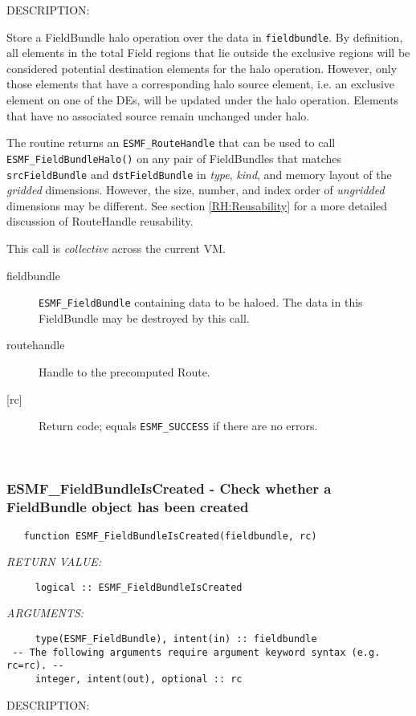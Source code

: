 {\sf DESCRIPTION:\\ }


   Store a FieldBundle halo operation over the data in {\tt fieldbundle}.
   By definition, all elements in the total Field regions that lie
   outside the exclusive regions will be considered potential destination
   elements for the halo operation. However, only those elements that have a corresponding
   halo source element, i.e. an exclusive element on one of the DEs, will be
   updated under the halo operation. Elements that have no associated source
   remain unchanged under halo.
  
   The routine returns an {\tt ESMF\_RouteHandle} that can be used to call
   {\tt ESMF\_FieldBundleHalo()} on any pair of FieldBundles that matches
   {\tt srcFieldBundle} and {\tt dstFieldBundle} in {\em type}, {\em kind},
   and memory layout of the {\em gridded} dimensions. However, the size,
   number, and index order of {\em ungridded} dimensions may be different.
   See section \ref{RH:Reusability} for a more detailed discussion of
   RouteHandle reusability.
  
   This call is {\em collective} across the current VM.
  
   \begin{description}
   \item [fieldbundle]
   {\tt ESMF\_FieldBundle} containing data to be haloed. The data in this
   FieldBundle may be destroyed by this call.
   \item [routehandle]
   Handle to the precomputed Route.
   \item [{[rc]}]
   Return code; equals {\tt ESMF\_SUCCESS} if there are no errors.
   \end{description}
   
 
\mbox{}\hrulefill\ 
 
\subsubsection [ESMF\_FieldBundleIsCreated] {ESMF\_FieldBundleIsCreated - Check whether a FieldBundle object has been created}


\begin{verbatim}   function ESMF_FieldBundleIsCreated(fieldbundle, rc)\end{verbatim}{\em RETURN VALUE:}
\begin{verbatim}     logical :: ESMF_FieldBundleIsCreated\end{verbatim}{\em ARGUMENTS:}
\begin{verbatim}     type(ESMF_FieldBundle), intent(in) :: fieldbundle
 -- The following arguments require argument keyword syntax (e.g. rc=rc). --
     integer, intent(out), optional :: rc\end{verbatim}
{\sf DESCRIPTION:\\ }


